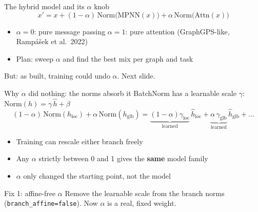 \documentclass[aspectratio=169,10pt]{beamer}
\newcommand{\snote}[1]{{\scriptsize\textcolor{ink!70}{#1}}}
\begin{document}
\begin{frame}{The hybrid model and its $\alpha$ knob}
  \[ x' = x + (1-\alpha)\,\mathrm{Norm}\big(\mathrm{MPNN}(x)\big) + \alpha\,\mathrm{Norm}\big(\mathrm{Attn}(x)\big) \]
  \begin{itemize}
    \item $\alpha = 0$: pure message passing \quad $\alpha=1$: pure attention \snote{(GraphGPS-like, Rampášek et al.\ 2022)}
    \item Plan: sweep $\alpha$ and find the best mix per graph and task
  \end{itemize}
  \vspace{0.4em}
  \centering
  \vspace{0.4em}

  \raggedright
  \alert{But}: as built, training could undo $\alpha$. Next slide.
\end{frame}

\begin{frame}{Why $\alpha$ did nothing: the norms absorb it}
  BatchNorm has a learnable scale $\gamma$:\quad $\mathrm{Norm}(h) = \gamma\,\hat h + \beta$
  \[ (1-\alpha)\,\mathrm{Norm}(h_{\text{loc}}) + \alpha\,\mathrm{Norm}(h_{\text{glb}})
     = \underbrace{(1-\alpha)\gamma_{\text{loc}}}_{\text{learned}}\,\hat h_{\text{loc}}
     + \underbrace{\alpha\,\gamma_{\text{glb}}}_{\text{learned}}\,\hat h_{\text{glb}} + \dots \]
  \begin{itemize}
    \item Training can rescale either branch freely
    \item Any $\alpha$ strictly between 0 and 1 gives the \textbf{same} model family
    \item $\alpha$ only changed the \alert{starting point}, not the model
  \end{itemize}
  \vspace{0.3em}
  \begin{exampleblock}{Fix 1: affine-free $\alpha$}
    Remove the learnable scale from the branch norms (\texttt{branch\_affine=false}). Now $\alpha$ is a real, fixed weight.
  \end{exampleblock}
\end{frame}
\end{document}
